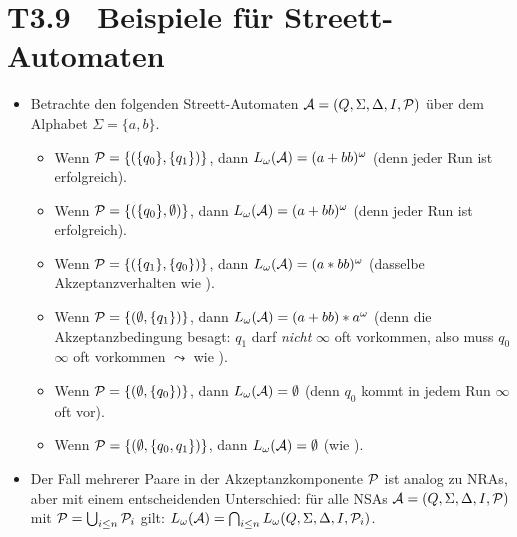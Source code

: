\documentclass[fontsize=11pt, twoside=false, numbers=autoenddot]{scrbook}
\begin{document}
\section*{T3.9~ Beispiele für Streett-Automaten}

\begin{itemize}
  \item 
    Betrachte den folgenden Streett-Automaten $\mathcal{A} = (Q,\Sigma,\Delta,I,\mathcal{P})$ über dem Alphabet $\Sigma = \{a,b\}$.
    \begin{center}
    \end{center}
    \begin{itemize}
      \item[\bspnr{(S1)}]
        Wenn $\mathcal{P} = \{(\{q_0\},\{q_1\})\}$, dann $L_\omega(\mathcal{A}) = (a+bb)^\omega$ (denn jeder Run ist erfolgreich).
      \item[\bspnr{(S2)}]
        Wenn $\mathcal{P} = \{(\{q_0\},\emptyset)\}$, dann $L_\omega(\mathcal{A}) = (a+bb)^\omega$ (denn jeder Run ist erfolgreich).
      \item[\bspnr{(S3)}]
        Wenn $\mathcal{P} = \{(\{q_1\},\{q_0\})\}$, dann $L_\omega(\mathcal{A}) = (a*bb)^\omega$ (dasselbe Akzeptanzverhalten wie ).
      \item[\bspnr{(S4)}]
        Wenn $\mathcal{P} = \{(\emptyset,\{q_1\})\}$, dann $L_\omega(\mathcal{A}) = (a+bb)*a^\omega$ (denn die Akzeptanzbedingung besagt: $q_1$ darf \emph{nicht} $\infty$ oft vorkommen, also muss $q_0$ $\infty$ oft vorkommen $\leadsto$ wie ).
      \item[\bspnr{(S5)}]
        Wenn $\mathcal{P} = \{(\emptyset,\{q_0\})\}$, dann $L_\omega(\mathcal{A}) = \emptyset$ (denn $q_0$ kommt in jedem Run $\infty$ oft vor).
      \item[\bspnr{(S6)}]
        Wenn $\mathcal{P} = \{(\emptyset,\{q_0,q_1\})\}$, dann $L_\omega(\mathcal{A}) = \emptyset$ (wie ).
    \end{itemize}
    \par\medskip    
  \item 
    Der Fall mehrerer Paare in der Akzeptanzkomponente $\mathcal{P}$ ist analog zu NRAs,
    aber mit einem entscheidenden Unterschied:
    für alle NSAs $\mathcal{A} = (Q,\Sigma,\Delta,I,\mathcal{P})$ mit $\mathcal{P} = \bigcup_{i \leq n} \mathcal{P}_i$ gilt:
    $L_\omega(\mathcal{A}) = \bigcap_{i \leq n} L_\omega(Q,\Sigma,\Delta,I,\mathcal{P}_i)$.
\end{itemize}
\end{document}
